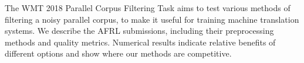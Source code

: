 The WMT 2018 Parallel Corpus Filtering Task aims to test various methods of filtering a noisy parallel corpus, to make it useful for training machine translation systems. We describe the AFRL submissions, including their preprocessing methods and quality metrics. Numerical results indicate relative benefits of different options and show where our methods are competitive.
